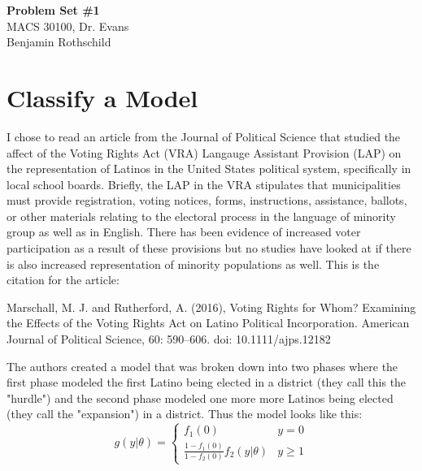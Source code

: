\documentclass{article}
\begin{document}
\begin{flushleft}
    \textbf{\large{Problem Set \#1}} \\
    MACS 30100, Dr. Evans \\
    Benjamin Rothschild
\end{flushleft}

\section{Classify a Model}
I chose to read an article from the Journal of Political Science that studied the affect of the Voting Rights Act (VRA) Langauge Assistant Provision (LAP) on the representation of Latinos in the United States political system, specifically in local school boards.  Briefly, the LAP in the VRA stipulates that municipalities must provide registration, voting notices, forms, instructions, assistance, ballots, or other materials relating to the electoral process in the language of minority group as well as in English.  There has been evidence of increased voter participation as a result of these provisions but no studies have looked at if there is also increased representation of minority populations as well.  This is the citation for the article: 
\vspace{5mm}

Marschall, M. J. and Rutherford, A. (2016), Voting Rights for Whom? Examining the Effects of the Voting Rights Act on Latino Political Incorporation. American Journal of Political Science, 60: 590–606. doi: 10.1111/ajps.12182
\vspace{5mm}

The authors created a model that was broken down into two phases where the first phase modeled the first Latino being elected in a district (they call this the "hurdle") and the second phase modeled one more more Latinos being elected (they call the "expansion") in a district.  Thus the model looks like this: 
\[ g(y|\theta) = \begin{cases} 
      f_1(0) & y=0 \\
      \frac{1-f_1(0)}{1-f_2(0)} f_2(y|\theta)&  y \geq 1
   \end{cases}
\]
\end{document}
